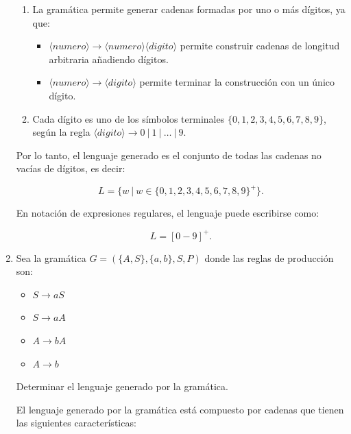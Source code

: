 \documentclass[12pt]{report} %
\begin{document}
\begin{enumerate}
\begin{solucion}[Ejercicio 2.b]
   \begin{enumerate}
       \item La gramática permite generar cadenas formadas por uno o más dígitos, ya que:
           \begin{itemize}
               \item $\langle numero \rangle \to \langle numero \rangle \langle digito \rangle$ permite construir cadenas de longitud arbitraria añadiendo dígitos.
               \item $\langle numero \rangle \to \langle digito \rangle$ permite terminar la construcción con un único dígito.
           \end{itemize}
       \item Cada dígito es uno de los símbolos terminales $\{0, 1, 2, 3, 4, 5, 6, 7, 8, 9\}$, según la regla $\langle digito \rangle \to 0 \ | \ 1 \ | \ \dots \ | \ 9$.
   \end{enumerate}

   Por lo tanto, el lenguaje generado es el conjunto de todas las cadenas no vacías de dígitos, es decir:

   $$
   L = \{ w \ | \ w \in \{0, 1, 2, 3, 4, 5, 6, 7, 8, 9\}^+ \}.
   $$

   En notación de expresiones regulares, el lenguaje puede escribirse como:

   $$
   L = [0-9]^+.
   $$

   \end{solucion}
\item
  Sea la gramática \(G = (\{A, S\}, \{a, b\}, S, P)\) donde las reglas
  de producción son:\\

  \begin{itemize}
       \item $S \to aS$
       \item $S \to aA$
       \item $A \to bA$
       \item $A \to b$
   \end{itemize}

  Determinar el lenguaje generado por la gramática.

  \begin{solucion}[Ejercicio 2.c]

   El lenguaje generado por la gramática está compuesto por cadenas que tienen las siguientes características:


\end{solucion}
\end{enumerate}
\end{document}
